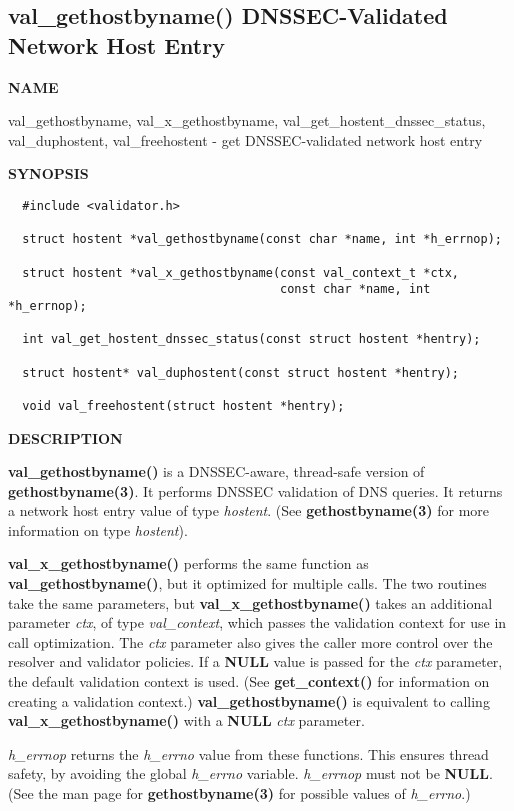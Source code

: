 \clearpage

\subsection{{\bf val\_gethostbyname()} DNSSEC-Validated Network Host Entry}


{\bf NAME}

val\_gethostbyname, val\_x\_gethostbyname, val\_get\_hostent\_dnssec\_status, val\_duphostent, val\_freehostent - get DNSSEC-validated network host entry

{\bf SYNOPSIS}

\begin{verbatim}
  #include <validator.h>

  struct hostent *val_gethostbyname(const char *name, int *h_errnop);

  struct hostent *val_x_gethostbyname(const val_context_t *ctx,
                                      const char *name, int *h_errnop);

  int val_get_hostent_dnssec_status(const struct hostent *hentry);

  struct hostent* val_duphostent(const struct hostent *hentry);

  void val_freehostent(struct hostent *hentry);
\end{verbatim}

{\bf DESCRIPTION}

{\bf val\_gethostbyname()} is a DNSSEC-aware, thread-safe version of {\bf
gethostbyname(3)}.  It performs DNSSEC validation of DNS queries.  It returns
a network host entry value of type {\it hostent}.  (See {\bf gethostbyname(3)}
for more information on type {\it hostent}).

{\bf val\_x\_gethostbyname()} performs the same function as {\bf
val\_gethostbyname()}, but it optimized for multiple calls.  The two routines
take the same parameters, but {\bf val\_x\_gethostbyname()} takes an
additional parameter {\it ctx}, of type {\it val\_context}, which passes the
validation context for use in call optimization.  The {\it ctx} parameter
also gives the caller more control over the resolver and validator policies.
If a {\bf NULL} value is passed for the {\it ctx} parameter, the default
validation context is used.  (See {\bf get\_context()} for information on
creating a validation context.) {\bf val\_gethostbyname()} is equivalent to
calling {\bf val\_x\_gethostbyname()} with a {\bf NULL} {\it ctx} parameter.

{\it h\_errnop} returns the {\it h\_errno} value from these functions.  This
ensures thread safety, by avoiding the global {\it h\_errno} variable.  {\it
h\_errnop} must not be {\bf NULL}.  (See the man page for {\bf
gethostbyname(3)} for possible values of {\it h\_errno}.)

